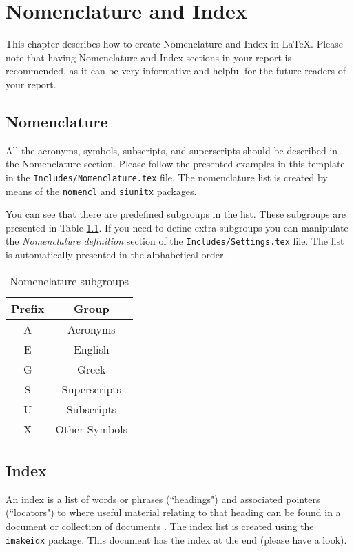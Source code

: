 \chapter{Nomenclature and Index}

This chapter describes how to create Nomenclature and Index in \LaTeX. Please note that having Nomenclature and Index sections in your report is recommended, as it can be very informative and helpful for the future readers of your report.

\section{Nomenclature}

All the acronyms, symbols, subscripts, and superscripts should be described in the Nomenclature section. Please follow the presented examples in this template in the \verb|Includes/Nomenclature.tex| file. The nomenclature list is created by means of the \verb|nomencl| and \verb|siunitx| packages.

You can see that there are predefined subgroups in the list. These subgroups are presented in Table \ref{tab:NomSubgroups}. If you need to define extra subgroups you can manipulate the \emph{Nomenclature definition} section of the \verb|Includes/Settings.tex| file. The list is automatically presented in the alphabetical order.

\begin{table}[!h]
	\caption{Nomenclature subgroups}
	\label{tab:NomSubgroups}
    \centering
    \begin{tabular}{c c}
		\hline
		Prefix & Group \\
		\hline
		A & Acronyms \\
		E & English \\
		G & Greek \\
		S & Superscripts \\
		U & Subscripts \\
		X & Other Symbols \\
		\hline
	\end{tabular}
\end{table}

\section{Index}
An index is a list of words or phrases (``headings") and associated pointers (``locators") to where useful material relating to that heading can be found in a document or collection of documents \cite{IndexWiki}. The index list is created using the \verb|imakeidx| package. This document has the index at the end (please have a look).

